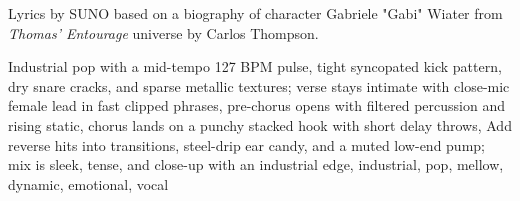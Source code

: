 
\begin{notes}
Lyrics by SUNO based on a biography of character Gabriele "Gabi" Wiater from \emph{Thomas’ Entourage} universe by Carlos Thompson.
\end{notes}
\begin{style}
Industrial pop with a mid-tempo 127 BPM pulse, tight syncopated kick pattern, dry snare cracks, and sparse metallic textures; verse stays intimate with close-mic female lead in fast clipped phrases, pre-chorus opens with filtered percussion and rising static, chorus lands on a punchy stacked hook with short delay throws, Add reverse hits into transitions, steel-drip ear candy, and a muted low-end pump; mix is sleek, tense, and close-up with an industrial edge, industrial, pop, mellow, dynamic, emotional, vocal
\end{style}
